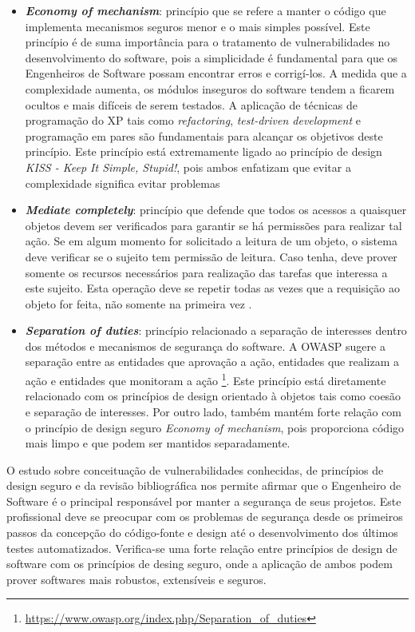 \begin{itemize}
\item \textbf{\emph{Economy of mechanism}}: princípio que se refere a manter o código que implementa mecanismos seguros menor e o mais simples possível. Este princípio é de suma importância para o tratamento de vulnerabilidades no desenvolvimento do software, pois a simplicidade é fundamental para que os Engenheiros de Software possam encontrar erros e corrigí-los. A medida que a complexidade aumenta, os módulos inseguros do software tendem a ficarem ocultos e mais difíceis de serem testados. A aplicação de técnicas de programação do XP tais como \emph{refactoring}, \emph{test-driven development} e programação em pares são fundamentais para alcançar os objetivos deste princípio. Este princípio está extremamente ligado ao princípio de design \emph{KISS - Keep It Simple, Stupid!}, pois ambos enfatizam que evitar a complexidade significa evitar problemas \cite{mcgraw2002}
\item \textbf{\emph{Mediate completely}}: princípio que defende que todos os acessos a quaisquer objetos devem ser verificados para garantir se há permissões para realizar tal ação. Se em algum momento for solicitado a leitura de um objeto, o sistema deve verificar se o sujeito tem permissão de leitura. Caso tenha, deve prover somente os recursos necessários para realização das tarefas que interessa a este sujeito. Esta operação deve se repetir todas as vezes que a requisição ao objeto for feita, não somente na primeira vez \cite{bishop2003}.
\item \textbf{\emph{Separation of duties}}: princípio relacionado a separação de interesses dentro dos métodos e mecanismos de segurança do software. A OWASP sugere a separação entre as entidades que aprovação a ação, entidades que realizam a ação e entidades que monitoram a ação \footnote{\url{https://www.owasp.org/index.php/Separation_of_duties}}. Este princípio está diretamente relacionado com os princípios de design orientado à objetos tais como coesão e separação de interesses. Por outro lado, também mantém forte relação com o princípio de design seguro \emph{Economy of mechanism}, pois proporciona código mais limpo e que podem ser mantidos separadamente.
\end{itemize}

%

O estudo sobre conceituação de vulnerabilidades conhecidas, de princípios de design seguro e da revisão bibliográfica nos permite afirmar que o Engenheiro de Software é o principal responsável por manter a segurança de seus projetos. Este profissional deve se preocupar com os problemas de segurança desde os primeiros passos da concepção do código-fonte e design até o desenvolvimento dos últimos testes automatizados. Verifica-se uma forte relação entre princípios de design de software com os princípios de desing seguro, onde a aplicação de ambos podem prover softwares mais robustos, extensíveis e seguros. 

